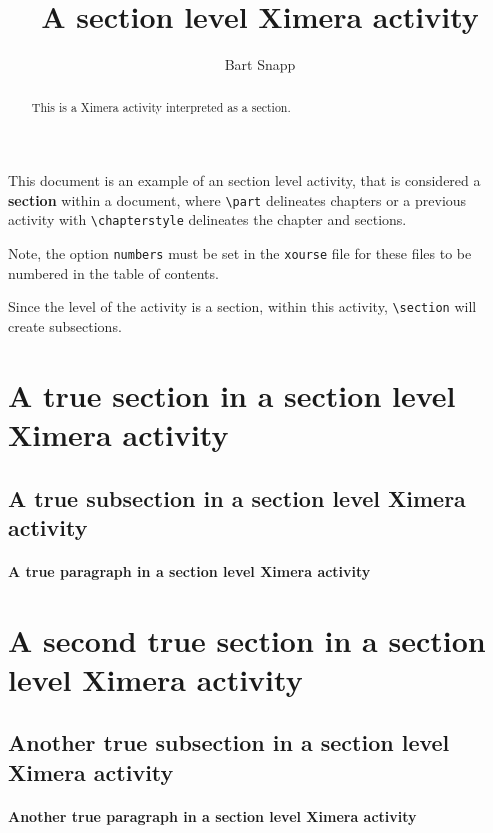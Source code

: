 \documentclass{ximera}
\author{Bart Snapp}
\title{A section level Ximera activity}
\begin{document}
\begin{abstract}
This is a Ximera activity interpreted as a section.
\end{abstract}
\maketitle

This document is an example of an section level activity, that is considered a
\textbf{section} within a document, where \verb!\part! delineates chapters or a
previous activity with \verb!\chapterstyle! delineates the chapter and sections.

Note, the option \verb!numbers! must be set in the \verb!xourse! file for these
files to be numbered in the table of contents.

\begin{warning}
    Since the level of the activity is a section, within this activity,
    \verb!\section! will create subsections.
\end{warning}

\section{A true section in a section level Ximera activity}
\lipsum[1]

\subsection{A true subsection in a section level Ximera activity}
\lipsum[1]

\paragraph{A true paragraph in a section level Ximera activity}
\lipsum[1]

\section{A second true section in a section level Ximera activity}
\lipsum[1]

\subsection{Another true subsection in a section level Ximera activity}
\lipsum[1]

\paragraph{Another true paragraph in a section level Ximera activity}
\lipsum[1]
\end{document}
